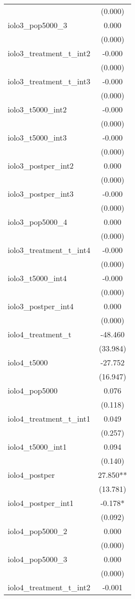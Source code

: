 \documentclass[]{article}
\begin{document}
\begin{tabular}{lc}
 & (0.000) \\
iolo3\_pop5000\_3 & 0.000 \\
 & (0.000) \\
iolo3\_treatment\_t\_int2 & -0.000 \\
 & (0.000) \\
iolo3\_treatment\_t\_int3 & -0.000 \\
 & (0.000) \\
iolo3\_t5000\_int2 & -0.000 \\
 & (0.000) \\
iolo3\_t5000\_int3 & -0.000 \\
 & (0.000) \\
iolo3\_postper\_int2 & 0.000 \\
 & (0.000) \\
iolo3\_postper\_int3 & -0.000 \\
 & (0.000) \\
iolo3\_pop5000\_4 & 0.000 \\
 & (0.000) \\
iolo3\_treatment\_t\_int4 & -0.000 \\
 & (0.000) \\
iolo3\_t5000\_int4 & -0.000 \\
 & (0.000) \\
iolo3\_postper\_int4 & 0.000 \\
 & (0.000) \\
iolo4\_treatment\_t & -48.460 \\
 & (33.984) \\
iolo4\_t5000 & -27.752 \\
 & (16.947) \\
iolo4\_pop5000 & 0.076 \\
 & (0.118) \\
iolo4\_treatment\_t\_int1 & 0.049 \\
 & (0.257) \\
iolo4\_t5000\_int1 & 0.094 \\
 & (0.140) \\
iolo4\_postper & 27.850** \\
 & (13.781) \\
iolo4\_postper\_int1 & -0.178* \\
 & (0.092) \\
iolo4\_pop5000\_2 & 0.000 \\
 & (0.000) \\
iolo4\_pop5000\_3 & 0.000 \\
 & (0.000) \\
iolo4\_treatment\_t\_int2 & -0.001 \\

\end{tabular}
\end{document}
